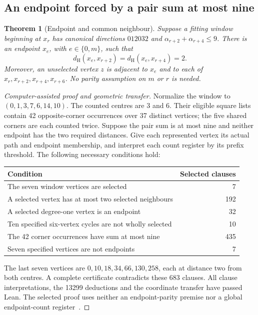 \documentclass[11pt,a4paper]{article}
\newtheorem{theorem}{Theorem}[section]
\theoremstyle{definition}
\theoremstyle{remark}
\newcommand{\Ham}{d_{\mathrm H}}
\begin{document}
\subsection{An endpoint forced by a pair sum at most nine}\label{sec:small-pair-endpoint}
\begin{theorem}[Endpoint and common neighbour]\label{thm:small-pair-endpoint}
Suppose a fitting window beginning at $x_r$ has canonical directions
$012032$ and $\alpha_{r+2}+\alpha_{r+4}\le9$. There is an endpoint
$x_e$, with $e\in\{0,m\}$, such that
\[
\Ham(x_e,x_{r+2})=\Ham(x_e,x_{r+4})=2.
\]
Moreover, an unselected vertex $z$ is adjacent to $x_e$ and to each of
$x_r,x_{r+2},x_{r+4},x_{r+6}$. No parity assumption on $m$ or $r$ is needed.
\end{theorem}
\begin{proof}[Computer-assisted proof and geometric transfer]
Normalize the window to $(0,1,3,7,6,14,10)$. The counted centres are 3 and 6.
Their eligible square lists contain 42 opposite-corner occurrences over
37 distinct vertices; the five shared corners are each counted twice.
Suppose the pair sum is at most nine and neither endpoint has the two
required distances. Give each represented vertex its actual path and
endpoint membership, and interpret each count register by its prefix threshold.
The following necessary conditions hold:
\begin{center}\small
\begin{tabular}{l r}
\toprule Condition & Selected clauses\\\midrule
The seven window vertices are selected & 7\\
A selected vertex has at most two selected neighbours & 192\\
A selected degree-one vertex is an endpoint & 32\\
Ten specified six-vertex cycles are not wholly selected & 10\\
The 42 corner occurrences have sum at most nine & 435\\
Seven specified vertices are not endpoints & 7\\\bottomrule
\end{tabular}
\end{center}
The last seven vertices are $0,10,18,34,66,130,258$, each at distance two
from both centres. A complete certificate contradicts these 683 clauses.
All clause interpretations, the 13299 deductions and the coordinate transfer
have passed Lean. The selected proof uses neither an endpoint-parity premise
nor a global endpoint-count register~\cite{lowpairarchive}.


\end{proof}
\end{document}
